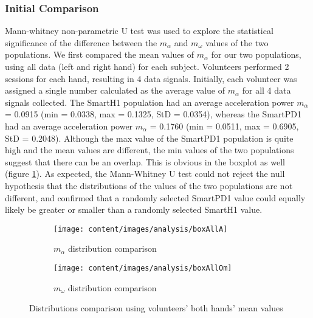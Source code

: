 \subsubsection{Initial Comparison}
\label{subsubsec:SmartCT1InitComp}
Mann-whitney non-parametric U test was used to explore the statistical significance of the difference between the $m_{\alpha}$ and $m_{\omega}$ values of the two populations. 
We first compared the mean values of $m_{\alpha}$ for our two populations, using all data (left and right hand) for each subject. Volunteers performed 2 sessions for each hand, resulting in 4 data signals. Initially, each volunteer was assigned a single number calculated as the average value of $m_{\alpha}$ for all 4 data signals collected. The \gls{SmartH1} population had an average acceleration power $m_{\alpha}$ = 0.0915 (min = 0.0338, max = 0.1325, StD = 0.0354), whereas the \gls{SmartPD1} had an average acceleration power $m_{\alpha}$ = 0.1760 (min = 0.0511, max = 0.6905, StD = 0.2048). Although the max value of the \gls{SmartPD1} population is quite high and the mean values are different, the min values of the two populations suggest that there can be an overlap. This is obvious in the boxplot as well (figure \ref{fig:boxAllA}). As expected, the Mann-Whitney U test could not reject the null hypothesis that the distributions of the values of the two populations are not different, and  confirmed that a randomly selected \gls{SmartPD1} value could equally likely be greater or smaller than a randomly selected \gls{SmartH1} value. 

\begin{figure}[h]
\centering
\begin{subfigure}{.5\textwidth}
  \centering
  \texttt{[image: content/images/analysis/boxAllA]}
  \caption{$m_{\alpha}$ distribution comparison}
  \label{fig:boxAllA}
\end{subfigure}%
\begin{subfigure}{.5\textwidth}
  \centering
  \texttt{[image: content/images/analysis/boxAllOm]}
  \caption{$m_{\omega}$ distribution comparison}
  \label{fig:boxAllOm}
\end{subfigure}
\caption{Distributions comparison using volunteers' both hands' mean values}
\label{fig:boxAll}
\end{figure}

